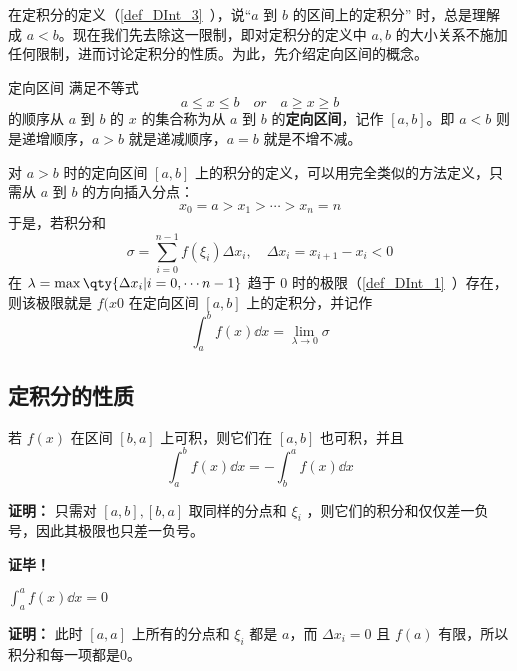 
在定积分的定义（\autoref{def_DInt_3}~），说“$a$ 到 $b$ 的区间上的定积分” 时，总是理解成 $a<b$。现在我们先去除这一限制，即对定积分的定义中 $a,b$ 的大小关系不施加任何限制，进而讨论定积分的性质。为此，先介绍定向区间的概念。

\begin{definition}{定向区间}
满足不等式
\begin{equation}
a\leq x\leq b\quad or\quad a\geq x\geq b
\end{equation}
的顺序从 $a$ 到 $b$ 的 $x$ 的集合称为从 $a$ 到 $b$ 的\textbf{定向区间}，记作 $[a,b]$。即 $a<b$ 则是递增顺序，$a>b$ 就是递减顺序，$a=b$ 就是不增不减。
\end{definition}
对 $a>b$ 时的定向区间 $[a,b]$ 上的积分的定义，可以用完全类似的方法定义，只需从 $a$ 到 $b$ 的方向插入分点：
\begin{equation}
x_0=a>x_1>\cdots>x_n=n
\end{equation}
于是，若积分和
\begin{equation}
\sigma=\sum_{i=0}^{n-1}f(\xi_i)\Delta x_i,\quad\Delta x_i=x_{i+1}-x_i<0
\end{equation}
在 $\lambda=\max\qty{\Delta x_i|i=0,\cdots n-1}$ 趋于 0 时的极限（\autoref{def_DInt_1}~）存在，则该极限就是 $f(x0$ 在定向区间 $[a,b]$ 上的定积分，并记作
\begin{equation}
\int_a^b f(x)\dd x=\lim_{\lambda\rightarrow0}\sigma
\end{equation}

\subsection{定积分的性质}
\begin{theorem}{}
若 $f(x)$ 在区间 $[b,a]$ 上可积，则它们在 $[a,b]$ 也可积，并且
\begin{equation}
\int_a^b f(x)\dd x=-\int_b^a f(x)\dd x
\end{equation}
\end{theorem} 

\textbf{证明：}
只需对 $[a,b],[b,a]$ 取同样的分点和 $\xi_i$ ，则它们的积分和仅仅差一负号，因此其极限也只差一负号。

\textbf{证毕！}
\begin{theorem}{}\label{the_DIntP_1}
$\int_a^a f(x)\dd x=0$
\end{theorem}
\textbf{证明：}
此时 $[a,a]$ 上所有的分点和 $\xi_i$ 都是 $a$，而 $\Delta x_i=0$ 且 $f(a)$ 有限，所以积分和每一项都是0。

